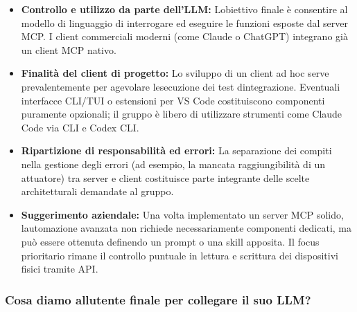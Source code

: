 \documentclass[12pt,a4paper]{article}
\newcommand{\tightlist}{\setlength{\itemsep}{1pt}\setlength{\parskip}{0pt}}
\begin{document}
\begin{itemize}
\tightlist
\item \textbf{Controllo e utilizzo da parte dell'LLM:} L\textquotesingle obiettivo finale è consentire al modello di linguaggio di interrogare ed eseguire le funzioni esposte dal server MCP. I client commerciali moderni (come Claude o ChatGPT) integrano già un client MCP nativo.
\item \textbf{Finalità del client di progetto:} Lo sviluppo di un client ad hoc serve prevalentemente per agevolare l\textquotesingle esecuzione dei test d\textquotesingle integrazione. Eventuali interfacce CLI/TUI o estensioni per VS Code costituiscono componenti puramente opzionali; il gruppo è libero di utilizzare strumenti come Claude Code via CLI e Codex CLI.
\item \textbf{Ripartizione di responsabilità ed errori:} La separazione dei compiti nella gestione degli errori (ad esempio, la mancata raggiungibilità di un attuatore) tra server e client costituisce parte integrante delle scelte architetturali demandate al gruppo.
\item \textbf{Suggerimento aziendale:} Una volta implementato un server MCP solido, l\textquotesingle automazione avanzata non richiede necessariamente componenti dedicati, ma può essere ottenuta definendo un prompt o una skill apposita. Il focus prioritario rimane il controllo puntuale in lettura e scrittura dei dispositivi fisici tramite API.
\end{itemize}

\hypertarget{cosa-diamo-allutente-finale-per-collegare-il-suo-llm}{%
\subsubsection{\texorpdfstring{Cosa diamo all\textquotesingle utente finale per collegare il suo LLM?}{Cosa diamo all'utente finale per collegare il suo LLM?}}}
\end{document}
